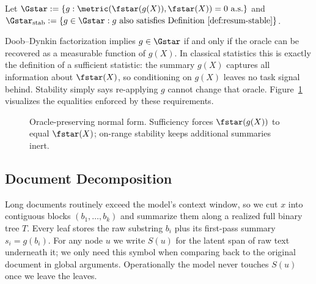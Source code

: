 \begin{definition}\label{def:exact-suff-stable}
Let $\Gstar := \{g : \metric(\fstar(g(X)), \fstar(X)) = 0\ \text{a.s.}\}$ and $\Gstar_{\mathrm{stab}} := \{g \in \Gstar : \text{$g$ also satisfies Definition~\ref{def:resum-stable}}\}$.
\end{definition}

Doob--Dynkin factorization implies $g \in \Gstar$ if and only if the oracle can be recovered as a measurable function of $g(X)$. In classical statistics this is exactly the definition of a sufficient statistic: the summary $g(X)$ captures all information about $\fstar(X)$, so conditioning on $g(X)$ leaves no task signal behind. Stability simply says re-applying $g$ cannot change that oracle. Figure~\ref{fig:gstar} visualizes the equalities enforced by these requirements.

\begin{figure}[t]
    \centering
    \caption{Oracle-preserving normal form. Sufficiency forces $\fstar(g(X))$ to equal $\fstar(X)$; on-range stability keeps additional summaries inert.}
    \label{fig:gstar}
\end{figure}

\subsection{Document Decomposition}

Long documents routinely exceed the model's context window, so we cut $x$ into contiguous blocks $(b_1, \ldots, b_k)$ and summarize them along a realized full binary tree $T$. Every leaf stores the raw substring $b_i$ plus its first-pass summary $s_i = g(b_i)$. For any node $u$ we write $S(u)$ for the latent span of raw text underneath it; we only need this symbol when comparing back to the original document in global arguments. Operationally the model never touches $S(u)$ once we leave the leaves.

